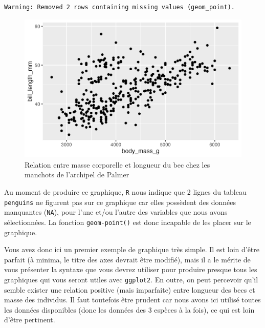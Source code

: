 \documentclass[
  letterpaper,
  DIV=11,
  numbers=noendperiod]{scrreprt}
\begin{document}
\begin{verbatim}
Warning: Removed 2 rows containing missing values (geom_point).
\end{verbatim}

\begin{figure}[H]

{\centering \includegraphics{./03-visualization_files/figure-pdf/unnamed-chunk-6-1.png}

}

\caption{Relation entre masse corporelle et longueur du bec chez les
manchots de l'archipel de Palmer}

\end{figure}

Au moment de produire ce graphique, \texttt{R} nous indique que 2 lignes
du tableau \texttt{penguins} ne figurent pas sur ce graphique car elles
possèdent des données manquantes (\texttt{NA}), pour l'une et/ou l'autre
des variables que nous avons sélectionnées. La fonction
\texttt{geom-point()} est donc incapable de les placer sur le graphique.

Vous avez donc ici un premier exemple de graphique très simple. Il est
loin d'être parfait (à minima, le titre des axes devrait être modifié),
mais il a le mérite de vous présenter la syntaxe que vous devrez
utiliser pour produire presque tous les graphiques qui vous seront
utiles avec \texttt{ggplot2}. En outre, on peut percevoir qu'il semble
exister une relation positive (mais imparfaite) entre longueur des becs
et masse des individus. Il faut toutefois être prudent car nous avons
ici utilisé toutes les données disponibles (donc les données des 3
espèces à la fois), ce qui est loin d'être pertinent.
\end{document}
